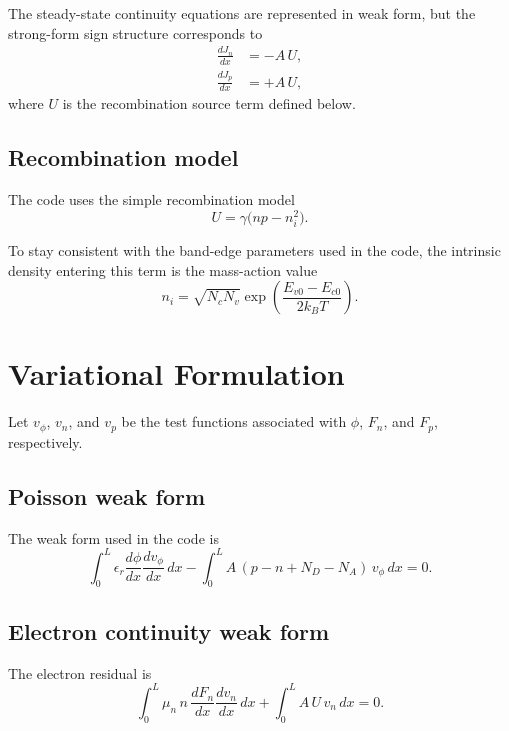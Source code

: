 \documentclass[11pt]{article}
\begin{document}
The steady-state continuity equations are represented in weak form, but the
strong-form sign structure corresponds to
\begin{align}
    \frac{dJ_n}{dx} &= -A\,U, \\
    \frac{dJ_p}{dx} &= +A\,U,
\end{align}
where $U$ is the recombination source term defined below.

\subsection{Recombination model}

The code uses the simple recombination model
\begin{equation}
    U = \gamma \bigl(np - n_i^2\bigr).
\end{equation}

To stay consistent with the band-edge parameters used in the code, the intrinsic
density entering this term is the mass-action value
\begin{equation}
    n_i = \sqrt{N_c N_v}
    \exp\!\left(
        \frac{E_{v0}-E_{c0}}{2k_B T}
    \right).
\end{equation}

\section{Variational Formulation}

Let $v_\phi$, $v_n$, and $v_p$ be the test functions associated with
$\phi$, $F_n$, and $F_p$, respectively.

\subsection{Poisson weak form}

The weak form used in the code is
\begin{equation}
    \int_0^L
    \epsilon_r
    \frac{d\phi}{dx}
    \frac{dv_\phi}{dx}\,dx
    -
    \int_0^L
    A\,(p-n+N_D-N_A)\,v_\phi\,dx
    = 0.
\end{equation}

\subsection{Electron continuity weak form}

The electron residual is
\begin{equation}
    \int_0^L
    \mu_n\,n\,\frac{dF_n}{dx}\frac{dv_n}{dx}\,dx
    +
    \int_0^L
    A\,U\,v_n\,dx
    = 0.
\end{equation}
\end{document}
